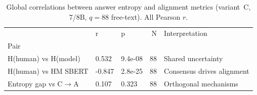 \begin{table}[t]
\centering
\caption{Global correlations between answer entropy and alignment metrics (variant~C, 7/8B, $q=88$ free-text). All Pearson $r$.}
\label{tab:entropy_corr}
\small
\begin{tabular}{lllrl}
\toprule
 & r & p & N & Interpretation \\
Pair &  &  &  &  \\
\midrule
H(human) vs H(model) & 0.532 & 9.4e-08 & 88 & Shared uncertainty \\
H(human) vs HM SBERT & -0.847 & 2.8e-25 & 88 & Consensus drives alignment \\
Entropy gap vs C$\to$A & 0.107 & 0.323 & 88 & Orthogonal mechanisms \\
\bottomrule
\end{tabular}
\end{table}
